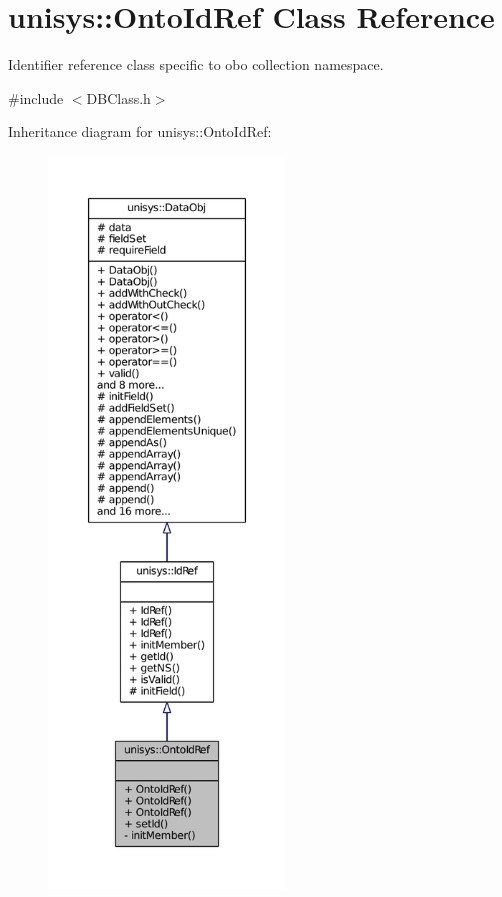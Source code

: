 \hypertarget{classunisys_1_1OntoIdRef}{\section{unisys\-:\-:Onto\-Id\-Ref Class Reference}
\label{classunisys_1_1OntoIdRef}
}


Identifier reference class specific to obo collection namespace.  




{\ttfamily \#include $<$D\-B\-Class.\-h$>$}



Inheritance diagram for unisys\-:\-:Onto\-Id\-Ref\-:
\nopagebreak
\begin{figure}[H]
\begin{center}
\leavevmode
\includegraphics[height=550pt]{classunisys_1_1OntoIdRef__inherit__graph}
\end{center}
\end{figure}


